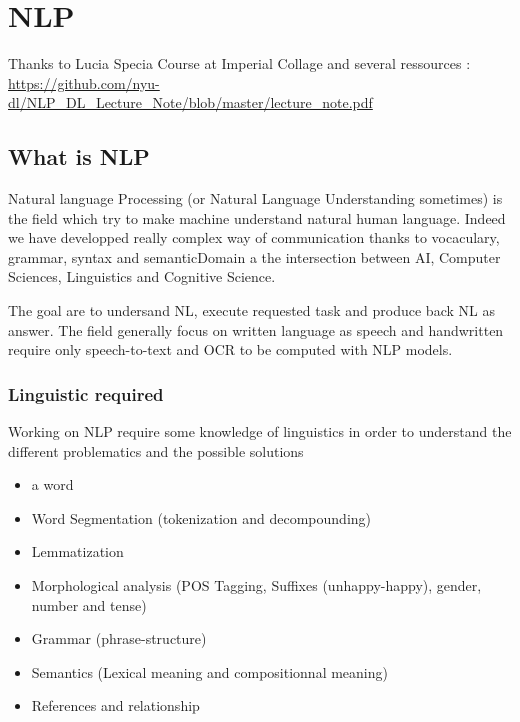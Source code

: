 \chapter{NLP} %
\label{cha:nlp}
		
		Thanks to Lucia Specia Course at Imperial Collage and several ressources : 
		\url{https://github.com/nyu-dl/NLP_DL_Lecture_Note/blob/master/lecture_note.pdf}
		
		\section{What is NLP}

			Natural language Processing (or Natural Language Understanding sometimes) is the field which try to make machine understand natural human language. Indeed we have developped really complex way of communication thanks to vocaculary, grammar, syntax and semanticDomain a the intersection between AI, Computer Sciences, Linguistics and Cognitive Science.

			The goal are to undersand NL, execute requested task and produce back NL as answer. The field generally focus on written language as speech and handwritten require only speech-to-text and OCR to be computed with NLP models. 

			\subsection{Linguistic required}

				Working on NLP require some knowledge of linguistics in order to understand the different problematics and the possible solutions
				\begin{itemize}
					\item  a word
					\item Word Segmentation (tokenization and decompounding)
					\item Lemmatization
					\item Morphological analysis (POS Tagging, Suffixes (unhappy-happy), gender, number and tense)
					\item Grammar (phrase-structure)
					\item Semantics (Lexical meaning and compositionnal meaning)
					\item References and relationship
				\end{itemize}

